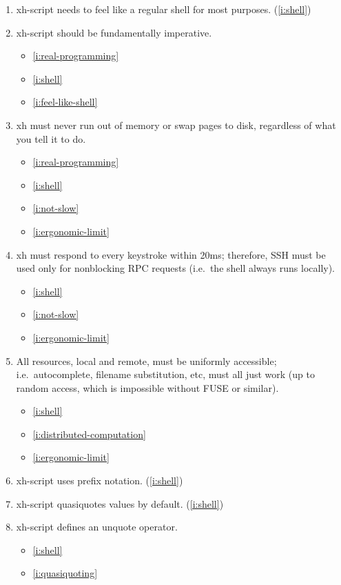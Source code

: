 \documentclass{report}
\makeatletter
\newcommand*{\Label}[2]{%
  \@bsphack
  \begingroup
    \label{#1-original}%
    \def\@currentlabel{#2 [\ref{#1-original}]}%
    \label{#1}%
  \endgroup
  \@esphack
}
\makeatother
\begin{document}
\begin{enumerate}
\item{}\Label{i:feel-like-shell}{likeshell}
  xh-script needs to feel like a regular shell for most purposes.
(\ref{i:shell})
\item{}\Label{i:imperative}{imperative}
  xh-script should be fundamentally imperative.
\begin{itemize}
\item \ref{i:real-programming}
\item \ref{i:shell}
\item \ref{i:feel-like-shell}
\end{itemize}
\item{}\Label{i:no-oome}{no-oome}
  xh must never run out of memory or swap pages to disk, regardless of what
  you tell it to do.
\begin{itemize}
\item \ref{i:real-programming}
\item \ref{i:shell}
\item \ref{i:not-slow}
\item \ref{i:ergonomic-limit}
\end{itemize}
\item{}\Label{i:nonblocking}{nonblock}
  xh must respond to every keystroke within 20ms; therefore, SSH must be
  used only for nonblocking RPC requests (i.e.~the shell always runs
  locally).
\begin{itemize}
\item \ref{i:shell}
\item \ref{i:not-slow}
\item \ref{i:ergonomic-limit}
\end{itemize}
\item{}\Label{i:remote-resources}{remotestuff}
  All resources, local and remote, must be uniformly accessible;
  i.e.~autocomplete, filename substitution, etc, must all just work (up to
  random access, which is impossible without FUSE or similar).
\begin{itemize}
\item \ref{i:shell}
\item \ref{i:distributed-computation}
\item \ref{i:ergonomic-limit}
\end{itemize}

\item{}\Label{i:prefix-notation}{prefix}
  xh-script uses prefix notation.
(\ref{i:shell})
\item{}\Label{i:quasiquoting}{quasiquote}
  xh-script quasiquotes values by default.
(\ref{i:shell})
\item{}\Label{i:unquoting}{unquote}
  xh-script defines an unquote operator.
\begin{itemize}
\item \ref{i:shell}
\item \ref{i:quasiquoting}
\end{itemize}


\end{enumerate}
\end{document}
